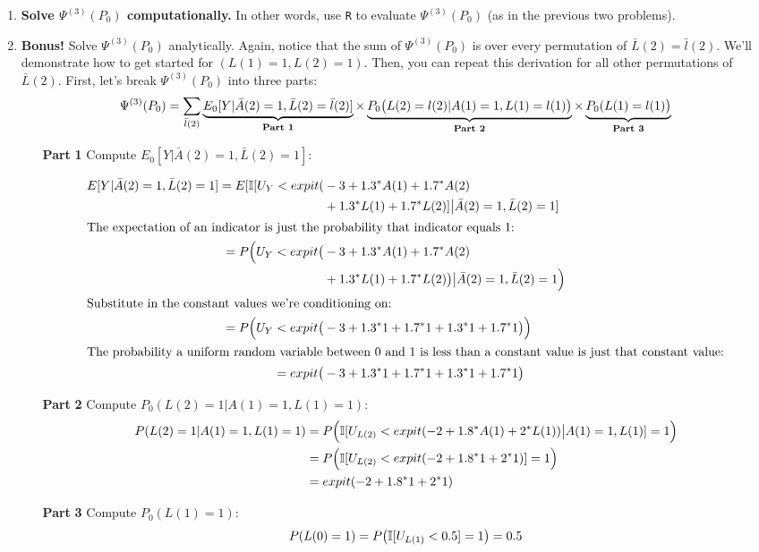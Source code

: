 \documentclass[answers]{exam}
\begin{document}
\begin{enumerate}
\begin{enumerate}

\item \textbf{Solve $\Psi^{(3)}(P_0)$ computationally.} In other words, use \texttt{R} to evaluate $\Psi^{(3)}(P_0)$ (as in the previous two problems).

\item \textbf{Bonus!} Solve $\Psi^{(3)}(P_0)$ analytically. Again, notice that the sum of $\Psi^{(3)}(P_0)$ is over every permutation of $\bar{L}(2) = \bar{l}(2)$. We'll demonstrate how to get started for $(L(1) = 1, L(2) = 1)$. Then, you can repeat this derivation for all other permutations of $\bar{L}(2)$. First, let's break $\Psi^{(3)}(P_0)$ into three parts:
\[
\Psi^{(3)}(P_0) = \sum_{\bar{l}(2)}\underbrace{E_0[Y | \bar{A}(2)=1, \bar{L}(2) = \bar{l}(2)]}_\text{\textbf{Part 1}} \times \underbrace{P_0\big{(}L(2) = l(2) | A(1)=1, L(1) = l(1)\big{)}}_\text{\textbf{Part 2}} \times \underbrace{P_0(L(1) = l(1)\big{)}}_\text{\textbf{Part 3}}
\]


\begin{enumerate}
\item[\textbf{Part}]\textbf{1} Compute $E_0[Y|\bar{A}(2)=1, \bar{L}(2) = 1]$:

\begin{align*}
E[Y|\bar{A}(2)=1, \bar{L}(2) = 1]  = E[\mathbb{I}[U_{Y}<expit(& -3+1.3^*A(1)+1.7^*A(2) \\
& + 1.3^*L(1)+1.7^*L(2)] \big{|} \bar{A}(2)=1, \bar{L}(2) = 1] \\
\intertext{The expectation of an indicator is just the probability that indicator equals 1:}
 =  P\Big{(}U_{Y}<expit\big{(}& -3+1.3^*A(1)+1.7^*A(2)\\
 & +1.3^*L(1)+1.7^*L(2)\big{)} \big{|} \bar{A}(2)=1, \bar{L}(2) = 1 \Big{)} \\
\intertext{Substitute in the constant values we're conditioning on:}
 = P\Big{(}U_{Y}<expit\big{(}& -3+1.3^*1+1.7^*1 +1.3^*1+1.7^*1\big{)}\Big{)} \\
\intertext{The probability a uniform random variable between $0$ and $1$ is less than a constant value is just that constant value:}
 = expit\big{(}&-3+1.3^*1+1.7^*1+ 1.3^*1+1.7^*1\big{)} \\
\end{align*}
\item[\textbf{Part}]\textbf{2} Compute $P_0(L(2) = 1 | A(1) = 1, L(1) = 1)$:
\begin{align*}
P(L(2) = 1 | A(1) = 1, L(1) = 1) & = P\Big{(}\mathbb{I}[U_{L(2)}<expit(-2+1.8^*A(1)+2^*L(1)) \big{|} A(1) = 1, L(1)] = 1\Big{)} \\
& =  P\Big{(}\mathbb{I}[U_{L(2)}<expit(-2+1.8^*1+2^*1)] = 1\Big{)} \\
& =  expit(-2+1.8^*1+2^*1)
\end{align*}
\item[\textbf{Part}]\textbf{3}  Compute $P_0(L(1) = 1)$:
\begin{align*}
P(L(0) = 1) & = P\big{(}\mathbb{I}[U_{L(1)} < 0.5] = 1\big{)} = 0.5 \\
\end{align*}


\end{enumerate}
\end{enumerate}
\end{enumerate}
\end{document}
